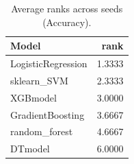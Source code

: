 \begin{table}[t]
\centering
\begin{tabular}{lr}
\toprule
Model & rank \\
\midrule
LogisticRegression & 1.3333 \\
sklearn_SVM & 2.3333 \\
XGBmodel & 3.0000 \\
GradientBoosting & 3.6667 \\
random_forest & 4.6667 \\
DTmodel & 6.0000 \\
\bottomrule
\end{tabular}
\caption{Average ranks across seeds (Accuracy).}
\label{tab:avg_rank_Accuracy}
\end{table}
